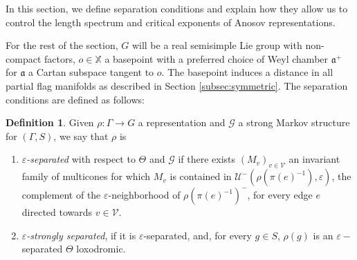 \documentclass{amsart}
\theoremstyle{remark}
\theoremstyle{definition}
\newtheorem{defi}[thm]{Definition}
\begin{document}
In this section, we define separation conditions and explain how they allow us to control the length spectrum and critical exponents of Anosov representations.

For the rest of the section, $G$ will be a real semisimple Lie group with non-compact factors, $o \in \mathbb{X}$ a basepoint with a preferred choice of Weyl chamber $\mathfrak{a}^+$ for $\mathfrak{a}$ a Cartan subspace tangent to $o$.
The basepoint induces a distance in all partial flag manifolds as described in Section \ref{subsec:symmetric}.
The separation conditions are defined as follows:


\begin{defi}
   \label{def:separatednested}
 Given $\rho : \Gamma \rightarrow G$ a representation and $\mathcal{G}$ a strong Markov structure for $(\Gamma,S)$, we say that $\rho$ is
    \begin{enumerate}
        \item \emph{$\varepsilon$-separated} with respect to $\Theta$ and $\mathcal{G}$ if there exists $(M_v)_{v \in \mathcal{V}}$ an invariant family of multicones for which $M_v$ is contained in $\mathcal{U}^- (\rho (\pi (e)^{-1}),\varepsilon)$, the complement of the $\varepsilon$-neighborhood of $\rho(\pi(e)^{-1})^-$, for every edge $e$ directed towards $v \in \mathcal{V}$.
        \item \emph{$\varepsilon$-strongly separated}, if it is $\varepsilon$-separated, and, for every $g \in S$, $\rho (g)$ is an $\varepsilon-$separated $\Theta$ loxodromic.
    \end{enumerate}
\end{defi}
\end{document}
